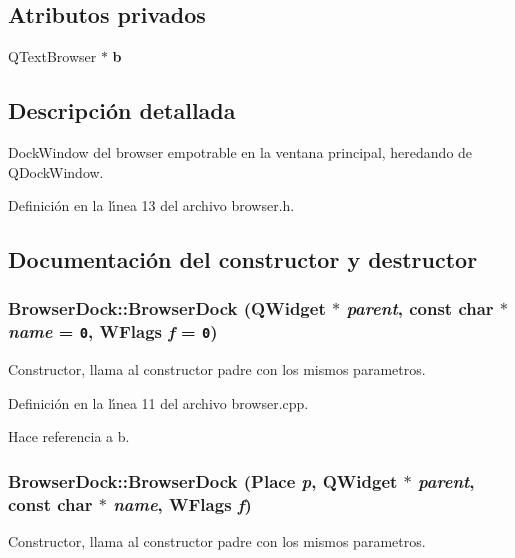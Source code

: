 \subsection*{Atributos privados}
\begin{CompactItemize}
\item 
QText\-Browser $\ast$ {\bf b}
\end{CompactItemize}


\subsection{Descripci\'{o}n detallada}
Dock\-Window del browser empotrable en la ventana principal, heredando de QDock\-Window. 



Definici\'{o}n en la l\'{\i}nea 13 del archivo browser.h.

\subsection{Documentaci\'{o}n del constructor y destructor}
\subsubsection{\setlength{\rightskip}{0pt plus 5cm}Browser\-Dock::Browser\-Dock (QWidget $\ast$ {\em parent}, const char $\ast$ {\em name} = {\tt 0}, WFlags {\em f} = {\tt 0})}\label{classBrowserDock_a0}


Constructor, llama al constructor padre con los mismos parametros. 



Definici\'{o}n en la l\'{\i}nea 11 del archivo browser.cpp.

Hace referencia a b.
\subsubsection{\setlength{\rightskip}{0pt plus 5cm}Browser\-Dock::Browser\-Dock (Place {\em p}, QWidget $\ast$ {\em parent}, const char $\ast$ {\em name}, WFlags {\em f})}\label{classBrowserDock_a1}


Constructor, llama al constructor padre con los mismos parametros. 



